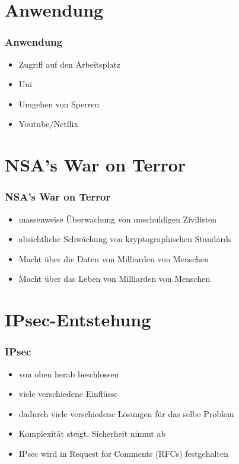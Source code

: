 \documentclass[t]{beamer}
\begin{document}
\section{Anwendung}
\begin{frame}
	\frametitle{Anwendung}
	\begin{itemize}
		\vfill
		\item Zugriff auf den Arbeitsplatz
		\vfill
		\item Uni
		\vfill
		\item Umgehen von Sperren
		\vfill
		\item Youtube/Netflix
	\end{itemize}
\end{frame}

\section{NSA's War on Terror}
\begin{frame}
	\frametitle{NSA's War on Terror}
	\begin{itemize}
		\item massenweise Überwachung von unschuldigen Zivilisten
		\item absichtliche Schwächung von kryptographischen Standards
		\item Macht über die Daten von Milliarden von Menschen
		\item Macht über das Leben von Milliarden von Menschen
	\end{itemize}

	
\end{frame}

\section{IPsec-Entstehung}
\begin{frame}
	\frametitle{IPsec}
	\begin{itemize}
		\vfill
		\item von oben herab beschlossen
		\vfill
		\item viele verschiedene Einflüsse
		\vfill
		\item dadurch viele verschiedene Lösungen für das selbe Problem
		\vfill
		\item Komplexität steigt, Sicherheit nimmt ab
		\vfill
		\item IPsec wird in Request for Comments (RFCs) festgehalten
		\vfill
	\end{itemize}
\end{frame}
\end{document}
